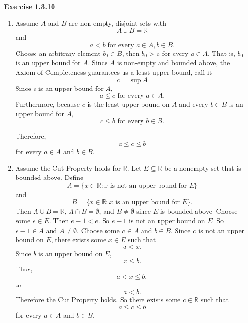 \documentclass[12pt]{article}
\begin{document}
\noindent{} \textbf{Exercise 1.3.10}
\begin{enumerate}
      \item [(a)]
            Assume $A$ and $B$ are non-empty, disjoint sets with
            \[
                  A \cup B = \mathbb{R}
            \]
            and
            \[
                  a < b \text{ for every } a \in A, b \in B.
            \]
            Choose an arbitrary element $b_0 \in B$, then $b_0 > a$ for every $a \in A$.
            That is, $b_0$ is an upper bound for $A$.
            Since $A$ is non-empty and bounded above, the Axiom of Completeness guarantees us a least upper bound,
            call it
            \[
                  c = \sup A
            \]
            Since $c$ is an upper bound for $A$,
            \[
                  a \leq c \text{ for every } a \in A.
            \]
            Furthermore, because $c$ is the least upper bound on $A$ and every $b \in B$ is an upper bound for $A$,
            \[
                  c \leq b \text{ for every } b \in B.
            \]

            Therefore,
            \[
                  a \leq c \leq b
            \]
            for every $a \in A$ and $b \in B$.
      \item [(b)]
            Assume the Cut Property holds for $\mathbb{R}$.
            Let $E \subseteq \mathbb{R}$ be a nonempty set that is bounded above.
            Define
            \[
                  A = \{x \in \mathbb{R} : x \text{ is not an upper bound for } E\}
            \]
            and
            \[
                  B = \{x \in \mathbb{R} : x \text{ is an upper bound for } E\}.
            \]
            Then $A \cup B = \mathbb{R}$, $A \cap B = \emptyset$, and $B \neq \emptyset$ since $E$ is bounded above.
            Choose some $e \in E$. Then $e - 1 < e$. So $e - 1$ is not an upper bound on $E$.
            So $e - 1 \in A$ and $A \neq \emptyset$.
            Choose some $a \in A$ and $b \in B$.
            Since $a$ is not an upper bound on $E$, there exists some $x \in E$ such that
            \[
                  a < x.
            \]
            Since $b$ is an upper bound on $E$,
            \[
                  x \leq b.
            \]
            Thus,
            \[
                  a < x \leq b,
            \]
            so
            \[
                  a < b.
            \]
            Therefore the Cut Property holds. So there exists some $c \in \mathbb{R}$ such that
            \[
                  a \leq c \leq b
            \]
            for every $a \in A$ and $b \in B$.


\end{enumerate}
\end{document}
